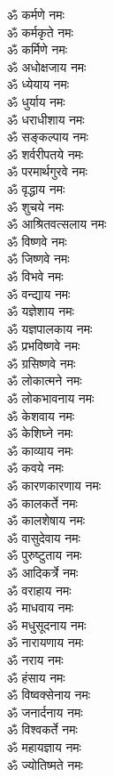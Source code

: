 \begin{multicols}{2}
\begin{flushleft}
ॐ कर्मणे नमः\\
ॐ कर्मकृते नमः\\
ॐ कर्मिणे नमः\\
ॐ अधोक्षजाय नमः\\
ॐ ध्येयाय नमः\\
ॐ धुर्याय नमः\\
ॐ धराधीशाय नमः\\
ॐ सङ्कल्पाय नमः\hfill{}\\
ॐ शर्वरीपतये नमः\\
ॐ परमार्थगुरवे नमः\\
ॐ वृद्धाय नमः\\
ॐ शुचये नमः\\
ॐ आश्रितवत्सलाय नमः\\
ॐ विष्णवे नमः\\
ॐ जिष्णवे नमः\\
ॐ विभवे नमः\\
ॐ वन्द्याय नमः\\
ॐ यज्ञेशाय नमः\hfill{}\\
ॐ यज्ञपालकाय नमः\\
ॐ प्रभविष्णवे नमः\\
ॐ ग्रसिष्णवे नमः\\
ॐ लोकात्मने नमः\\
ॐ लोकभावनाय नमः\\
ॐ केशवाय नमः\\
ॐ केशिघ्ने नमः\\
ॐ काव्याय नमः\\
ॐ कवये नमः\\
ॐ कारणकारणाय नमः\hfill{}\\
ॐ कालकर्ते नमः\\
ॐ कालशेषाय नमः\\
ॐ वासुदेवाय नमः\\
ॐ पुरुष्टुताय नमः\\
ॐ आदिकर्त्रे नमः\\
ॐ वराहाय नमः\\
ॐ माधवाय नमः\\
ॐ मधुसूदनाय नमः\\
ॐ नारायणाय नमः\\
ॐ नराय नमः\hfill{}\\
ॐ हंसाय नमः\\
ॐ विष्वक्सेनाय नमः\\
ॐ जनार्दनाय नमः\\
ॐ विश्वकर्ते नमः\\
ॐ महायज्ञाय नमः\\
ॐ ज्योतिष्मते नमः\\

\end{flushleft}
\end{multicols}
